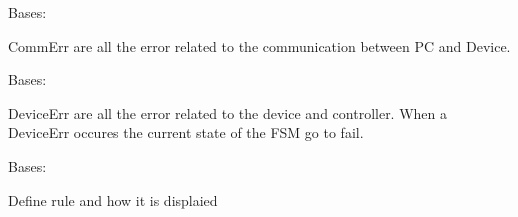 \documentclass[letterpaper,10pt,english]{sphinxmanual}
\begin{document}

\begin{fulllineitems}
\label{enuActor.Devices:enuActor.Devices.Error.CommErr}
Bases: {\hyperref[enuActor.Devices:enuActor.Devices.Error.RuleError]{}}

CommErr are all the error related to the communication
between PC and Device.

\end{fulllineitems}


\begin{fulllineitems}
\label{enuActor.Devices:enuActor.Devices.Error.DeviceErr}
Bases: {\hyperref[enuActor.Devices:enuActor.Devices.Error.RuleError]{}}

DeviceErr are all the error related to the device and controller.
When a DeviceErr occures the current state of the FSM go to fail.

\end{fulllineitems}


\begin{fulllineitems}
\label{enuActor.Devices:enuActor.Devices.Error.RuleError}
Bases: 

Define rule and how it is displaied

\begin{fulllineitems}
\label{enuActor.Devices:enuActor.Devices.Error.RuleError.PRIORITY_DEFAULT}
\end{fulllineitems}


\begin{fulllineitems}
\label{enuActor.Devices:enuActor.Devices.Error.RuleError.errno}
\end{fulllineitems}


\begin{fulllineitems}
\label{enuActor.Devices:enuActor.Devices.Error.RuleError.strerror}
\end{fulllineitems}


\end{fulllineitems}
\end{document}
